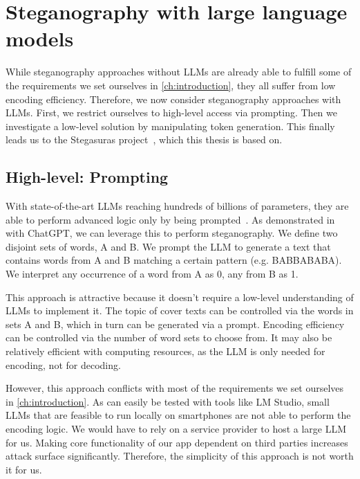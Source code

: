 \section{Steganography with large language models}
\label{sec:steganographyWithLLMs}
While steganography approaches without \glspl{LLM} are already able to fulfill some of the requirements we set ourselves in \cref{ch:introduction}, they all suffer from low encoding efficiency. Therefore, we now consider steganography approaches with \glspl{LLM}. First, we restrict ourselves to high-level access via prompting. Then we investigate a low-level solution by manipulating token generation. This finally leads us to the Stegasuras project~\cite{zieglerNeuralLinguisticSteganography2019}, which this thesis is based on.

\subsection{High-level: Prompting}
\label{sec:highLevelPrompting}
With state-of-the-art \glspl{LLM} reaching hundreds of billions of parameters, they are able to perform advanced logic only by being prompted~\cite{hossainLLMProSAnalyzingLarge2025}. As demonstrated in~\cite{steinebachNaturalLanguageSteganography2024} with ChatGPT, we can leverage this to perform steganography. We define two disjoint sets of words, A and B. We prompt the \gls{LLM} to generate a text that contains words from A and B matching a certain pattern (e.g. BABBABABA). We interpret any occurrence of a word from A as 0, any from B as 1.

This approach is attractive because it doesn't require a low-level understanding of \glspl{LLM} to implement it. The topic of cover texts can be controlled via the words in sets A and B, which in turn can be generated via a prompt. Encoding efficiency can be controlled via the number of word sets to choose from. It may also be relatively efficient with computing resources, as the \gls{LLM} is only needed for encoding, not for decoding.

However, this approach conflicts with most of the requirements we set ourselves in \cref{ch:introduction}. As can easily be tested with tools like LM Studio, small \glspl{LLM} that are feasible to run locally on smartphones are not able to perform the encoding logic. We would have to rely on a service provider to host a large \gls{LLM} for us. Making core functionality of our app dependent on third parties increases attack surface significantly. Therefore, the simplicity of this approach is not worth it for us.

